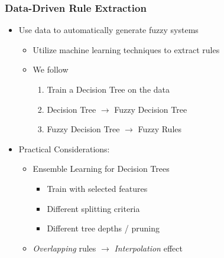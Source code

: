 \documentclass[
	10pt,
	t		%
]{beamer}
\begin{document}
\begin{frame}
	\frametitle{Data-Driven Rule Extraction}
	\begin{itemize}

		\item Use data to automatically generate fuzzy systems
		      \begin{itemize}
			      \item Utilize machine learning techniques to extract rules
			      \item We follow \cite{CROCKETT20062809}
			            \begin{enumerate}
				            \item Train a Decision Tree on the data
				            \item Decision Tree $\rightarrow$ Fuzzy Decision Tree
				            \item Fuzzy Decision Tree $\rightarrow$ Fuzzy Rules
			            \end{enumerate}
		      \end{itemize}
		\item Practical Considerations:
		      \begin{itemize}
			      \item Ensemble Learning for Decision Trees
			            \begin{itemize}
				            \item Train with selected features
				            \item Different splitting criteria
				            \item Different tree depths / pruning
			            \end{itemize}
			      \item \textit{Overlapping} rules $\rightarrow$ \textit{Interpolation} effect
		      \end{itemize}
	\end{itemize}
\end{frame}
\end{document}
